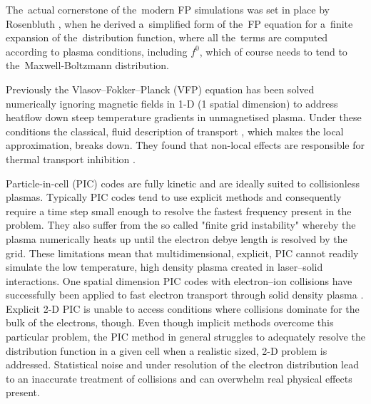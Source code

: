 
The~actual cornerstone of the~modern FP simulations was set in place
by Rosenbluth \cite{Rosenbluth_PR1957}, when he derived a~simplified form 
of the~FP equation for a~finite expansion of the~distribution function,
where all the~terms are computed according to plasma conditions, including
$f^0$, which of course needs to tend to the~Maxwell-Boltzmann distribution.

Previously the Vlasov–Fokker–Planck (VFP) equation has been solved
numerically ignoring magnetic fields in 1-D (1 spatial dimension) 
\cite{Bell_1981_83, Matte_1982_86} to address heatflow down steep temperature 
gradients in unmagnetised plasma. Under these conditions the classical, fluid
description of transport \cite{SpitzerHarm_PR1953, Braginskii_1965_3}, 
which makes the local approximation, 
breaks down. They found that non-local effects are responsible for 
thermal transport inhibition \cite{Bell_1981_83}.

Particle-in-cell (PIC) codes \cite{PIC_Birdsall_Langdon_1985}
are fully kinetic and are ideally suited to collisionless plasmas. 
Typically PIC codes tend to use explicit methods and consequently require a
time step small enough to resolve the fastest frequency present in the problem.
They also suffer from the so called "finite grid instability" 
\cite{PIC_Birdsall_Langdon_1985} 
whereby the plasma numerically heats up until the electron debye length is
resolved by the grid. These limitations mean that multidimensional, explicit, 
PIC cannot readily simulate the low temperature, high density plasma created in 
laser–solid interactions. 
One spatial dimension PIC codes with electron–ion collisions have successfully 
been applied to fast electron transport through solid density plasma 
\cite{Guerin_PPCF1999, Perez_PoP2012}. 
Explicit 2-D PIC is unable to access conditions where collisions dominate for
the bulk of the electrons, though. Even though implicit methods overcome 
this particular problem, the PIC method in general struggles to adequately 
resolve the distribution function in a given cell when a realistic sized, 
2-D problem is addressed. Statistical noise and under resolution of 
the electron distribution lead to an inaccurate treatment of collisions and 
can overwhelm real physical effects present.


